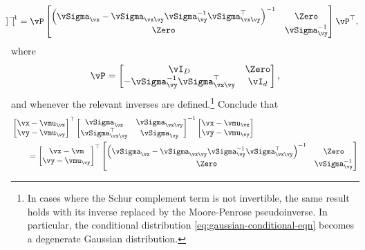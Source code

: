 \documentclass[../../book-main.tex]{subfiles}
\begin{document}
\begin{exercise}
\begin{enumerate}
\begin{equation}
\begin{bmatrix}
        \end{bmatrix}^{-1}
        =
		\vP
        \begin{bmatrix}
          \left(\vSigma_{\vx} - \vSigma_{\vx\vy} \vSigma_{\vy}^{-1}
          \vSigma_{\vx\vy}^{\top}\right)^{-1} & \Zero \\
          \Zero & \vSigma_{\vy}^{-1}
        \end{bmatrix}
		\vP^\top,
      \end{equation}
	  where
	  \begin{equation}
		  \vP = 
        \begin{bmatrix}
          \vI_D & \Zero\\
          -\vSigma_{\vy}^{-1}\vSigma_{\vx\vy}^\top & \vI_d
        \end{bmatrix},
	  \end{equation}
      and whenever the relevant inverses are defined.\footnote{In cases where the
      Schur complement term is not invertible, the same result holds with its
      inverse replaced by the Moore-Penrose pseudoinverse. In particular, the
      conditional distribution \eqref{eq:gaussian-conditional-eqn} becomes
      a degenerate Gaussian distribution.}
      Conclude that
      \begin{align}
        &\begin{bmatrix}
          \vx-\vmu_{\vx} \\
          \vy-\vmu_{\vy}
        \end{bmatrix}^{\top}
        \begin{bmatrix}
          \vSigma_{\vx} & \vSigma_{\vx\vy} \\
          \vSigma_{\vx\vy}^\top & \vSigma_{\vy}
        \end{bmatrix}^{-1}
        \begin{bmatrix}
          \vx-\vmu_{\vx} \\
          \vy-\vmu_{\vy}
        \end{bmatrix}
        \\
        &\qquad=
        \begin{bmatrix}
          \vx - \vm \\
          \vy - \vmu_{\vy}
        \end{bmatrix}^\top
        \begin{bmatrix}
          \left(\vSigma_{\vx} - \vSigma_{\vx\vy} \vSigma_{\vy}^{-1}
          \vSigma_{\vx\vy}^{\top}\right)^{-1} & \Zero \\
          \Zero & \vSigma_{\vy}^{-1}
        \end{bmatrix}

\end{align}
\end{enumerate}
\end{exercise}
\end{document}
